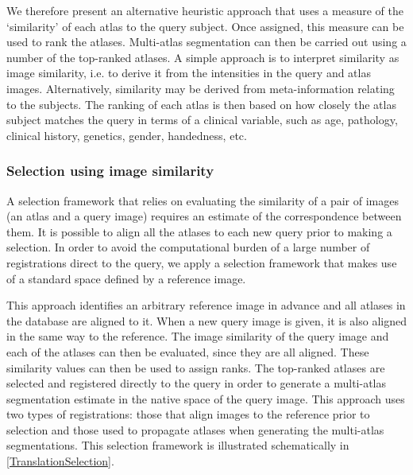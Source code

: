 We therefore present an alternative heuristic approach that uses a
measure of the ‘similarity’ of each atlas to the query subject. Once
assigned, this measure can be used to rank the atlases. Multi-atlas
segmentation can then be carried out using a number of the top-ranked
atlases. A simple approach is to interpret similarity as image similarity,
i.e. to derive it from the intensities in the query and atlas images.
Alternatively, similarity may be derived from meta-information relating
to the subjects. The ranking of each atlas is then based on how closely
the atlas subject matches the query in terms of a clinical variable, such
as age, pathology, clinical history, genetics, gender, handedness, etc.

\subsubsection*{Selection using image similarity}
A selection framework that relies on evaluating the similarity of a
pair of images (an atlas and a query image) requires an estimate of the
correspondence between them. It is possible to align all the atlases to
each new query prior to making a selection. In order to avoid the
computational burden of a large number of registrations direct to the
query, we apply a selection framework that makes use of a standard
space defined by a reference image.

This approach identifies an arbitrary reference image in advance
and all atlases in the database are aligned to it. When a new query
image is given, it is also aligned in the same way to the reference. The
image similarity of the query image and each of the atlases can then be
evaluated, since they are all aligned. These similarity values can then
be used to assign ranks. The top-ranked atlases are selected and
registered directly to the query in order to generate a multi-atlas
segmentation estimate in the native space of the query image. This
approach uses two types of registrations: those that align images to
the reference prior to selection and those used to propagate atlases
when generating the multi-atlas segmentations. This selection framework
is illustrated schematically in \ref{TranslationSelection}. 
\setcounter{chapter}{5}

